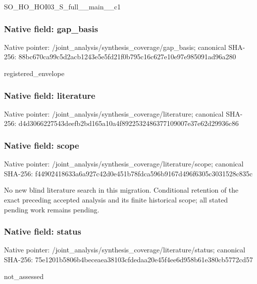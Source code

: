 \documentclass[10pt,a4paper]{article}
\begin{document}
\begingroup\raggedright\sloppy SO\_\allowbreak{}HO\_\allowbreak{}HOI03\_\allowbreak{}S\_\allowbreak{}full\_\allowbreak{}\_\allowbreak{}main\_\allowbreak{}\_\allowbreak{}c1\par\endgroup

\subsubsection{Native field: gap\_\allowbreak{}basis}
Native pointer: /joint\_\allowbreak{}analysis/synthesis\_\allowbreak{}coverage/gap\_\allowbreak{}basis; canonical SHA-256: 88bc670ca99c5d2acb1243e5e5fd21f0b795c16c627e10e97e985091ad96a280

\begingroup\raggedright\sloppy registered\_\allowbreak{}envelope\par\endgroup

\subsubsection{Native field: literature}
Native pointer: /joint\_\allowbreak{}analysis/synthesis\_\allowbreak{}coverage/literature; canonical SHA-256: d4d3066227543deefb2bd165a10a4f8922532486377109007e37e62d29936c86

\subsubsection{Native field: scope}
Native pointer: /joint\_\allowbreak{}analysis/synthesis\_\allowbreak{}coverage/literature/scope; canonical SHA-256: f44902418633a6a927c42d0e451b78fdca596b9167d496f6305c3031528c835c

\begingroup\raggedright\sloppy No new blind literature search in this migration. Conditional retention of the exact preceding accepted analysis and its finite historical scope;\allowbreak{} all stated pending work remains pending.\par\endgroup

\subsubsection{Native field: status}
Native pointer: /joint\_\allowbreak{}analysis/synthesis\_\allowbreak{}coverage/literature/status; canonical SHA-256: 75e1201b5806b4beceaea38103cfdedaa20e45f4ee6d958b61e380cb5772cd57

\begingroup\raggedright\sloppy not\_\allowbreak{}assessed\par\endgroup
\end{document}
